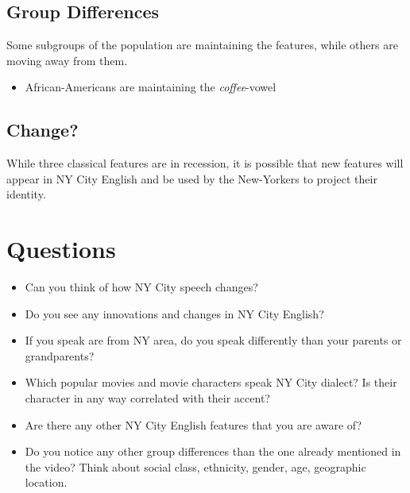 \documentclass[11pt]{article}
\newcommand{\1}{$'$}
\newcommand{\2}{$''$}
\newcommand{\3}{$'''$}
\begin{document}
\subsection{Group Differences}

Some subgroups of the population are maintaining the features, while others are moving away from them.

\begin{itemize}
\item African-Americans are maintaining the \emph{coffee}-vowel	
\end{itemize}

\subsection{Change?}

While three classical features are in recession, it is possible that new features will appear in NY City English and be used by the New-Yorkers to project their identity.

\section{Questions}

\begin{itemize}
\item Can you think of how NY City speech changes? 
\item Do you see any innovations and changes in NY City English? 
\item If you speak are from NY area, do you speak differently than your parents or grandparents?
\item Which popular movies and movie characters speak NY City dialect? Is their character in any way correlated with their accent?
\item Are there any other NY City English features that you are aware of?
\item Do you notice any other group differences than the one already mentioned in the video? Think about social class, ethnicity, gender, age, geographic location.
\end{itemize}








\end{document}
